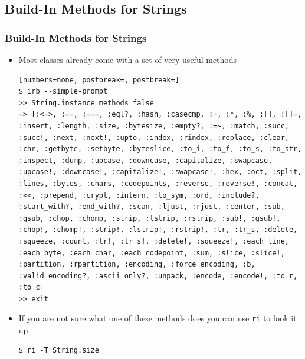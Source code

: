 \documentclass{beamer}
\begin{document}
\subsection{Build-In Methods for Strings}
\begin{frame}
\frametitle{Build-In Methods for Strings}
\begin{itemize}
 \item Most classes already come with a set of very useful methods
\lstset{language=shell}
\begin{lstlisting}[numbers=none, postbreak=, postbreak=]
$ irb --simple-prompt
>> String.instance_methods false
=> [:<=>, :==, :===, :eql?, :hash, :casecmp, :+, :*, :%, :[], :[]=, :insert, :length, :size, :bytesize, :empty?, :=~, :match, :succ, :succ!, :next, :next!, :upto, :index, :rindex, :replace, :clear, :chr, :getbyte, :setbyte, :byteslice, :to_i, :to_f, :to_s, :to_str, :inspect, :dump, :upcase, :downcase, :capitalize, :swapcase, :upcase!, :downcase!, :capitalize!, :swapcase!, :hex, :oct, :split, :lines, :bytes, :chars, :codepoints, :reverse, :reverse!, :concat, :<<, :prepend, :crypt, :intern, :to_sym, :ord, :include?, :start_with?, :end_with?, :scan, :ljust, :rjust, :center, :sub, :gsub, :chop, :chomp, :strip, :lstrip, :rstrip, :sub!, :gsub!, :chop!, :chomp!, :strip!, :lstrip!, :rstrip!, :tr, :tr_s, :delete, :squeeze, :count, :tr!, :tr_s!, :delete!, :squeeze!, :each_line, :each_byte, :each_char, :each_codepoint, :sum, :slice, :slice!, :partition, :rpartition, :encoding, :force_encoding, :b, :valid_encoding?, :ascii_only?, :unpack, :encode, :encode!, :to_r, :to_c]
>> exit
\end{lstlisting}

\item If you are not sure what one of these methods does you can use \texttt{ri} to look it up
\lstset{language=shell}
\begin{lstlisting}[numbers=none, escapechar=!]
$ ri -T String.size
\end{lstlisting}
\end{itemize}

\end{frame}
\end{document}

